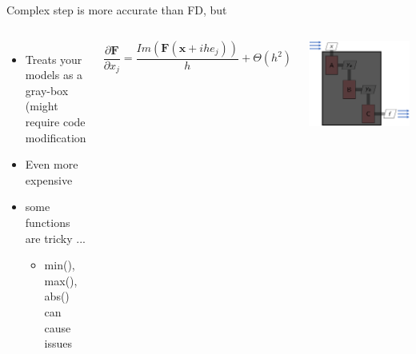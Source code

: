 \documentclass[aspectratio=169, usenames,dvipsnames, 14pt]{beamer}
\begin{document}
\begin{frame}{Complex step is more accurate than FD, but}
    \begin{columns}
            \begin{itemize}
                \item Treats your models as a gray-box (might require code modification
                \item Even more expensive
                \item some functions are tricky ...
                    \begin{itemize}
                        \item min(), max(), abs() can cause issues
                    \end{itemize}
            \end{itemize}
        
            \vspace{-0.5cm}
        
            \begin{equation*}
                \frac{\partial \textbf{F}}{\partial x_{j}} =\frac{Im(\textbf{F}(\textbf{x}+ihe_{j}))}{h} +\Theta (h^{2})
            \end{equation*}
        
            \includegraphics[scale=0.27]{images/slide75.png}
    \end{columns}
    
\end{frame}    
\end{document}
